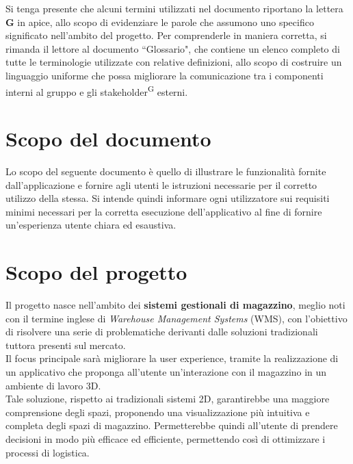 \begin{beginningnote}
    Si tenga presente che alcuni termini utilizzati nel documento riportano la lettera \textbf{G} in apice, allo scopo di evidenziare le parole che assumono uno specifico 
    significato nell'ambito del progetto. Per comprenderle in maniera corretta, si rimanda il lettore al documento ``Glossario", che contiene un elenco completo di tutte le 
    terminologie utilizzate con relative definizioni, allo scopo di costruire un linguaggio uniforme che possa migliorare la comunicazione tra i componenti interni al gruppo 
    e gli stakeholder\textsuperscript{G} esterni.
\end{beginningnote}

\section{Scopo del documento}\label{sec:scopo_del_documento}
    Lo scopo del seguente documento è quello di illustrare le funzionalità fornite dall'applicazione e fornire agli utenti le istruzioni necessarie per il corretto utilizzo 
    della stessa. Si intende quindi informare ogni utilizzatore sui requisiti minimi necessari per la corretta esecuzione dell'applicativo al fine di fornire un'esperienza 
    utente chiara ed esaustiva.    

\section{Scopo del progetto}\label{sec:scopo_del_progetto}

    Il progetto nasce nell'ambito dei \textbf{sistemi gestionali di magazzino}, meglio noti con il termine inglese di \textit{Warehouse Management Systems} (WMS), con 
    l'obiettivo di risolvere una serie di problematiche derivanti dalle soluzioni tradizionali tuttora presenti sul mercato.\\
    Il focus principale sarà migliorare la user experience, tramite la realizzazione di un applicativo che proponga all'utente un'interazione con il magazzino in un 
    ambiente di lavoro 3D. \\
    Tale soluzione, rispetto ai tradizionali sistemi 2D, garantirebbe una maggiore comprensione degli spazi, proponendo una visualizzazione più intuitiva e completa 
    degli spazi di magazzino. Permetterebbe quindi all'utente di prendere decisioni in modo più efficace ed efficiente, permettendo così di ottimizzare i processi di logistica.

